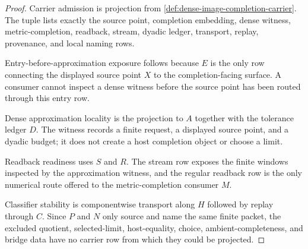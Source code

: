 \begin{proof}
Carrier admission is projection from \autoref{def:dense-image-completion-carrier}. The tuple lists exactly the source point, completion embedding, dense witness, metric-completion, readback, stream, dyadic ledger, transport, replay, provenance, and local naming rows.

Entry-before-approximation exposure follows because $E$ is the only row connecting the displayed source point $X$ to the completion-facing surface. A consumer cannot inspect a dense witness before the source point has been routed through this entry row.

Dense approximation locality is the projection to $A$ together with the tolerance ledger $D$. The witness records a finite request, a displayed source point, and a dyadic budget; it does not create a host completion object or choose a limit.

Readback readiness uses $S$ and $R$. The stream row exposes the finite windows inspected by the approximation witness, and the regular readback row is the only numerical route offered to the metric-completion consumer $M$.

Classifier stability is componentwise transport along $H$ followed by replay through $C$. Since $P$ and $N$ only source and name the same finite packet, the excluded quotient, selected-limit, host-equality, choice, ambient-completeness, and bridge data have no carrier row from which they could be projected.
\end{proof}

